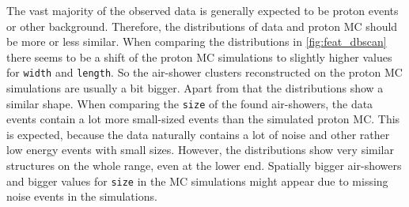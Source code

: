 The vast majority of the observed data is generally expected to be proton
events or other background. Therefore, the distributions of data and proton MC
should be more or less similar. When comparing the distributions in
\autoref{fig:feat_dbscan} there seems to be a shift of the proton MC
simulations to slightly higher values for \texttt{width} and \texttt{length}.
So the air-shower clusters reconstructed on the proton MC simulations are
usually a bit bigger. Apart from that the distributions show a similar shape.
When comparing the \texttt{size} of the found air-showers, the data events
contain a lot more small-sized events than the simulated proton MC. This is
expected, because the data naturally contains a lot of noise and other rather
low energy events with small sizes. However, the distributions show very
similar structures on the whole range, even at the lower end. Spatially bigger
air-showers and bigger values for \texttt{size} in the MC simulations might
appear due to missing noise events in the simulations.

